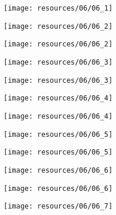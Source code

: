 \begin{frame}{ }
    \centering
    \texttt{[image: resources/06/06\_1]}
\end{frame}
\begin{frame}{ }
    \centering
    \texttt{[image: resources/06/06\_2]}
\end{frame}
\begin{frame}{ }
    \centering
    \texttt{[image: resources/06/06\_2]}
\end{frame}
\begin{frame}{ }
    \centering
    \texttt{[image: resources/06/06\_3]}
\end{frame}
\begin{frame}{ }
    \centering
    \texttt{[image: resources/06/06\_3]}
\end{frame}
\begin{frame}{ }
    \centering
    \texttt{[image: resources/06/06\_4]}
\end{frame}
\begin{frame}{ }
    \centering
    \texttt{[image: resources/06/06\_4]}
\end{frame}
\begin{frame}{ }
    \centering
    \texttt{[image: resources/06/06\_5]}
\end{frame}
\begin{frame}{ }
    \centering
    \texttt{[image: resources/06/06\_5]}
\end{frame}
\begin{frame}{ }
    \centering
    \texttt{[image: resources/06/06\_6]}
\end{frame}
\begin{frame}{ }
    \centering
    \texttt{[image: resources/06/06\_6]}
\end{frame}
\begin{frame}{ }
    \centering
    \texttt{[image: resources/06/06\_7]}
\end{frame}
